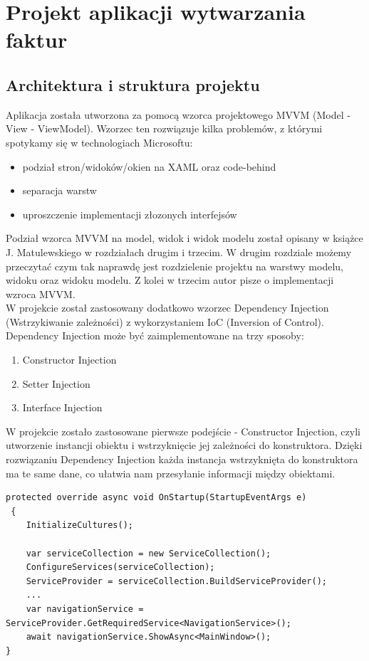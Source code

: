 \chapter{Projekt aplikacji wytwarzania faktur}

\section{Architektura i struktura projektu}
Aplikacja została utworzona za pomocą wzorca projektowego MVVM (Model - View - ViewModel). Wzorzec ten rozwiązuje kilka problemów, z którymi spotykamy się w technologiach Microsoftu:

\begin{itemize}
    \item podział stron/widoków/okien na XAML oraz code-behind
    \item separacja warstw
    \item uproszczenie implementacji złozonych interfejsów
\end{itemize}

Podział wzorca MVVM na model, widok i widok modelu został opisany w książce J. Matulewskiego \cite{MVVMBook} w rozdziałach drugim i trzecim. W drugim rozdziale możemy przeczytać czym tak naprawdę jest rozdzielenie projektu na warstwy modelu, widoku oraz widoku modelu. Z kolei w trzecim autor pisze o implementacji wzroca MVVM. \\
W projekcie został zastosowany dodatkowo wzorzec Dependency Injection (Wstrzykiwanie zależności) z wykorzystaniem IoC (Inversion of Control). Dependency Injection może być zaimplementowane na trzy sposoby:

\begin{enumerate}
    \item Constructor Injection
    \item Setter Injection
    \item Interface Injection
\end{enumerate}

W projekcie zostało zastosowane pierwsze podejście - Constructor Injection, czyli utworzenie instancji obiektu i wstrzyknięcie jej zależności do konstruktora. Dzięki rozwiązaniu Dependency Injection każda instancja wstrzyknięta do konstruktora ma te same dane, co ułatwia nam przesyłanie informacji między obiektami.

\begin{lstlisting}[language={[Sharp]C},label=list:DIinit,caption=Inicjalizacja dependency injection, basicstyle=\footnotesize\ttfamily]
protected override async void OnStartup(StartupEventArgs e)
 {
    InitializeCultures();
    
    var serviceCollection = new ServiceCollection();
    ConfigureServices(serviceCollection);
    ServiceProvider = serviceCollection.BuildServiceProvider();
    ...
    var navigationService = ServiceProvider.GetRequiredService<NavigationService>();
    await navigationService.ShowAsync<MainWindow>();
}
\end{lstlisting}

